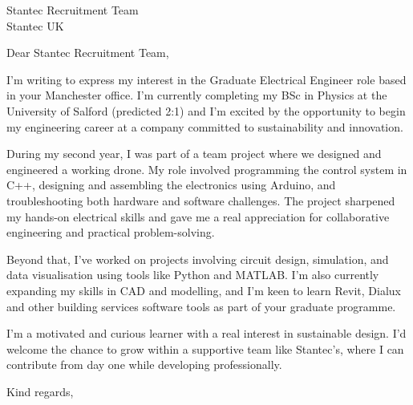 \documentclass[a4paper,11pt]{letter}
\date{26 June 2025}
\begin{document}
\begin{letter}{Stantec Recruitment Team\\Stantec UK}

\opening{Dear Stantec Recruitment Team,}

I’m writing to express my interest in the Graduate Electrical Engineer role based in your Manchester office. I’m currently completing my BSc in Physics at the University of Salford (predicted 2:1) and I’m excited by the opportunity to begin my engineering career at a company committed to sustainability and innovation.

During my second year, I was part of a team project where we designed and engineered a working drone. My role involved programming the control system in C++, designing and assembling the electronics using Arduino, and troubleshooting both hardware and software challenges. The project sharpened my hands-on electrical skills and gave me a real appreciation for collaborative engineering and practical problem-solving.

Beyond that, I’ve worked on projects involving circuit design, simulation, and data visualisation using tools like Python and MATLAB. I’m also currently expanding my skills in CAD and modelling, and I’m keen to learn Revit, Dialux and other building services software tools as part of your graduate programme.

I’m a motivated and curious learner with a real interest in sustainable design. I’d welcome the chance to grow within a supportive team like Stantec’s, where I can contribute from day one while developing professionally.

\closing{Kind regards,}

\end{letter}
\end{document}
